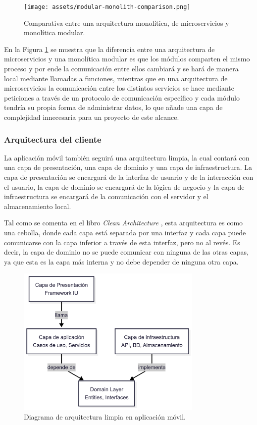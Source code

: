 \begin{figure}[H]
  \centering
  \texttt{[image: assets/modular-monolith-comparison.png]}
  \caption{Comparativa entre una arquitectura monolítica, de microservicios y monolítica modular. \parencite{tsechelidis2023modular}}
  \label{fig:modular-monolith-comparison}
\end{figure}

En la Figura \ref{fig:modular-monolith-comparison} se muestra que la diferencia entre una arquitectura de microservicios y una monolítica modular es que los módulos comparten el mismo proceso y por ende la comunicación entre ellos cambiará y se hará de manera local mediante llamadas a funciones, mientras que en una arquitectura de microservicios la comunicación entre los distintos servicios se hace mediante peticiones a través de un protocolo de comunicación específico y cada módulo tendría su propia forma de administrar datos, lo que añade una capa de complejidad innecesaria para un proyecto de este alcance.

\subsubsection{Arquitectura del cliente}
La aplicación móvil también seguirá una arquitectura limpia, la cual contará con una capa de presentación, una capa de dominio y una capa de infraestructura.
La capa de presentación se encargará de la interfaz de usuario y de la interacción con el usuario, la capa de dominio se encargará de la lógica de negocio y la capa de infraestructura se encargará de la comunicación con el servidor y el almacenamiento local.

Tal como se comenta en el libro \textit{Clean Architecture} \parencite{uncle-bob-clean-architecture}, esta arquitectura es como una cebolla, donde cada capa está separada por una interfaz y cada capa puede comunicarse con la capa inferior a través de esta interfaz, pero no al revés.
Es decir, la capa de dominio no se puede comunicar con ninguna de las otras capas, ya que esta es la capa más interna y no debe depender de ninguna otra capa.


\begin{figure}[H]
  \centering
  \includegraphics[width=0.8\textwidth]{assets/clean-architecture-mobile.png}
  \caption{Diagrama de arquitectura limpia en aplicación móvil.}
  \label{fig:clean-architecture-mobile}
\end{figure}

